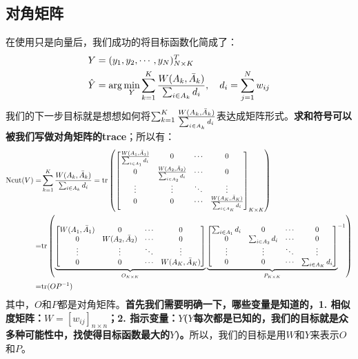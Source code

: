 \documentclass[a4paper]{article}
\begin{document}
\subsection{对角矩阵}
在使用只是向量后，我们成功的将目标函数化简成了：
\begin{equation}
    \begin{split}
        & Y = (y_1,y_2,\cdots,y_N)^T_{N\times K} \\
        & \hat{Y} = \arg\min_{Y} \sum_{k=1}^K \frac{ W(A_k,\Bar{A}_k)}{\sum_{i\in A_k} d_i },\quad d_i = \sum_{j=1}^N w_{ij} 
    \end{split}
\end{equation}
我们的下一步目标就是想想如何将$\sum_{k=1}^K \frac{ W(A_k,\Bar{A}_k)}{\sum_{i\in A_k} d_i } $表达成矩阵形式。\textbf{求和符号可以被我们写做对角矩阵的trace}；所以有：
\begin{equation}
\begin{split}
    \mathrm{Ncut}(V) = & \sum_{k=1}^K \frac{ W(A_k,\Bar{A}_k)}{\sum_{i\in A_k} d_i } = 
    \mathrm{tr}
    \left(
    \begin{bmatrix}
    \frac{ W(A_1,\Bar{A}_1)}{\sum_{i\in A_1} d_i } & 0 & \cdots & 0 \\
    0 & \frac{ W(A_2,\Bar{A}_2)}{\sum_{i\in A_2} d_i } &   \cdots & 0 \\
    \vdots & \vdots & \ddots & \vdots \\
    0 & 0  &   \cdots & \frac{ W(A_K,\Bar{A}_K)}{\sum_{i\in A_K} d_i } \\
    \end{bmatrix}_{K\times K} 
    \right) \\
    = & 
    \mathrm{tr}
    \left(
    \underbrace{
    \begin{bmatrix}
    { W(A_1,\Bar{A}_1)} & 0 & \cdots & 0 \\
    0 &  W(A_2,\Bar{A}_2) &   \cdots & 0 \\
    \vdots & \vdots & \ddots & \vdots \\
    0 & 0  &   \cdots & { W(A_K,\Bar{A}_K)} \\
    \end{bmatrix}}_{O_{K\times K}}
    {\underbrace{\begin{bmatrix}
    {\sum_{i\in A_1} d_i } & 0 & \cdots & 0 \\
    0 & {\sum_{i\in A_2} d_i } &   \cdots & 0 \\
    \vdots & \vdots & \ddots & \vdots \\
    0 & 0  &   \cdots & {\sum_{i\in A_K} d_i } \\
    \end{bmatrix}}_{P_{K\times K}}}^{-1}
    \right)
    \\
    = & \mathrm{tr}(OP^{-1})
\end{split}
\end{equation}
其中，$O$和$P$都是对角矩阵。\textbf{首先我们需要明确一下，哪些变量是知道的，1. 相似度矩阵：$W=[w_{ij}]_{n\times n}$；2. 指示变量：$Y$($Y$每次都是已知的，我们的目标就是众多种可能性中，找使得目标函数最大的$Y$)。}{\color{red}所以，我们的目标是用$W$和$Y$来表示$O$和$P$。}
\end{document}
